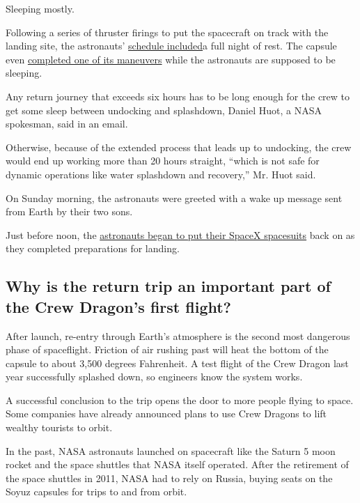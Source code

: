 Sleeping mostly.

Following a series of thruster firings to put the spacecraft on track
with the landing site, the astronauts'
\href{https://twitter.com/NASA/status/1289245570565992449}{schedule
included}a full night of rest. The capsule even
\href{https://twitter.com/Commercial_Crew/status/1289744080214212609}{completed
one of its maneuvers} while the astronauts are supposed to be sleeping.

Any return journey that exceeds six hours has to be long enough for the
crew to get some sleep between undocking and splashdown, Daniel Huot, a
NASA spokesman, said in an email.

Otherwise, because of the extended process that leads up to undocking,
the crew would end up working more than 20 hours straight, ``which is
not safe for dynamic operations like water splashdown and recovery,''
Mr. Huot said.

On Sunday morning, the astronauts were greeted with a wake up message
sent from Earth by their two sons.

Just before noon, the
\href{https://www.nytimes3xbfgragh.onion/2020/05/27/fashion/SpaceX-Dragon-Suits.html}{astronauts
began to put their SpaceX spacesuits} back on as they completed
preparations for landing.

\hypertarget{why-is-the-return-trip-an-important-part-of-the-crew-dragons-first-flight}{%
\subsection{Why is the return trip an important part of the Crew
Dragon's first
flight?}\label{why-is-the-return-trip-an-important-part-of-the-crew-dragons-first-flight}}

After launch, re-entry through Earth's atmosphere is the second most
dangerous phase of spaceflight. Friction of air rushing past will heat
the bottom of the capsule to about 3,500 degrees Fahrenheit. A test
flight of the Crew Dragon last year successfully splashed down, so
engineers know the system works.

A successful conclusion to the trip opens the door to more people flying
to space. Some companies have already announced plans to use Crew
Dragons to lift wealthy tourists to orbit.

In the past, NASA astronauts launched on spacecraft like the Saturn 5
moon rocket and the space shuttles that NASA itself operated. After the
retirement of the space shuttles in 2011, NASA had to rely on Russia,
buying seats on the Soyuz capsules for trips to and from orbit.


